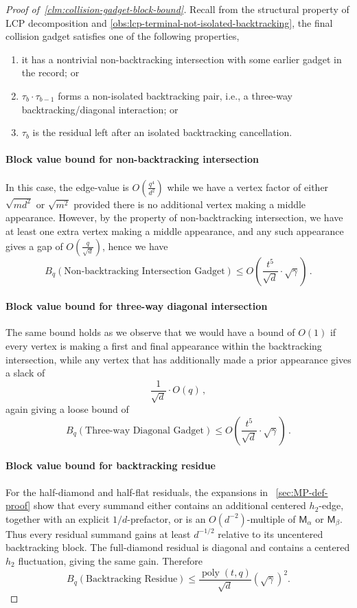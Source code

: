 \documentclass[12pt]{article}
\newcommand{\poly}{\operatorname{poly}}
\newcommand{\cm}{\mathsf{M} }
\begin{document}
\begin{proof}[Proof of~\cref{clm:collision-gadget-block-bound}]
	Recall from the structural property of LCP decomposition and \cref{obs:lcp-terminal-not-isolated-backtracking}, the final collision gadget satisfies one of the following properties,
	\begin{enumerate}
    \item it has a nontrivial non-backtracking intersection with some
    earlier gadget in the record; or

    \item \(\tau_b\cdot\tau_{b-1}\) forms a non-isolated backtracking pair,
    i.e., a three-way backtracking/diagonal interaction; or

    \item  $\tau_b$ is the residual left after an isolated
    backtracking cancellation.
\end{enumerate}

\paragraph{Block value bound for non-backtracking intersection}
In this case, the edge-value is $O(\frac{q^4}{d^2})$ while we have a vertex factor of either \( 
\sqrt{md^2} 
\) or \( \sqrt{m^2} \) provided there is no additional vertex making a middle appearance. However, by the property of non-backtracking intersection, we have at least one extra vertex making a middle appearance, and any such appearance gives a gap of $O(\frac{q}{\sqrt{d}} )$, hence we have \[ 
B_q( \text{Non-backtracking Intersection Gadget} ) \leq O(\frac{t^5}{\sqrt{d}} \cdot \sqrt{\gamma} )\,.
\]

\paragraph{Block value bound for three-way diagonal intersection}
The same bound holds as we observe that we would have a bound of $O(1)$ if every vertex is making a first and final appearance within the backtracking intersection, while any vertex that has additionally made a prior appearance gives a slack of \[ 
\frac{1}{\sqrt{d}} \cdot O(q)\,,
\]
again giving a loose bound of
 \[ 
B_q( \text{Three-way Diagonal Gadget} ) \leq O(\frac{t^5}{\sqrt{d}} \cdot \sqrt{\gamma} )\,.
\]
\paragraph{Block value bound for backtracking residue}
For the half-diamond and half-flat residuals, the expansions in
~\cref{sec:MP-def-proof} show that every  summand either
contains an additional centered \(h_2\)-edge, together with an explicit
\(1/d\)-prefactor, or is an \(O(d^{-2})\)-multiple of
\(\cm_\alpha\) or \(\cm_\beta\). Thus every residual summand gains at
least \(d^{-1/2}\) relative to its uncentered backtracking block. The
full-diamond residual is diagonal and contains a centered \(h_2\)
fluctuation, giving the same gain. Therefore
\[
    B_q( \text{Backtracking Residue})
    \le
    \frac{\poly(t,q)}{\sqrt d}
    (\sqrt\gamma)^2.
\]


\end{proof}
\end{document}
